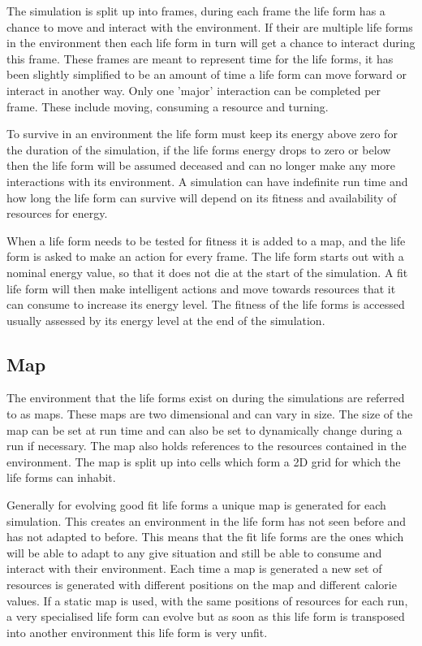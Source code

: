 \documentclass[12pt]{article}
\begin{document}
The simulation is split up into frames, during each frame the life form has a chance to move and interact with the environment. If their
are multiple life forms in the environment then each life form in turn will get a chance to interact during this frame. These frames are
meant to represent time for the life forms, it has been slightly simplified to be an amount of time a life form can move forward or interact in another way. Only one 'major' interaction can be completed per frame. These include moving, consuming a resource and turning.

To survive in an environment the life form must keep its energy above zero for the duration of the simulation, if the life forms energy
drops to zero or below then the life form will be assumed deceased and can no longer make any more interactions with its environment. A simulation can have indefinite run time and how long the life form can survive will depend on its fitness and availability of resources for energy.

When a life form needs to be tested for fitness it is added to a map, and the life form is asked to make an action for every frame. The life form starts out
with a nominal energy value, so that it does not die at the start of the simulation. A fit life form will then make intelligent actions and move towards resources
that it can consume to increase its energy level. The fitness of the life forms is accessed usually assessed by its energy level at the end of the simulation. 


\subsection{Map}

The environment that the life forms exist on during the simulations are referred to as maps. These maps are two dimensional and can vary in size.
The size of the map can be set at run time and can also be set to dynamically change during a run if necessary. The map also holds references
to the resources contained in the environment. The map is split up into cells which form a 2D grid for which the life forms can inhabit. 

Generally for evolving good fit life forms a unique map is generated for each simulation. This creates an environment in the life form has not
seen before and has not adapted to before. This means that the fit life forms are the ones which will be able to adapt to any give situation
and still be able to consume and interact with their environment. Each time a map is generated a new set of resources is generated with different
positions on the map and different calorie values. If a static map is used, with the same positions of resources for each run, a very specialised 
life form can evolve but as soon as this life form is transposed into another environment this life form is very unfit.
\end{document}
